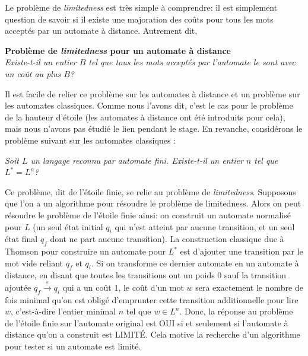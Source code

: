 \documentclass[12pt]{memoir}
\begin{document}
Le problème de \emph{limitedness} est très simple à comprendre: il est simplement
question de savoir si il existe une majoration des coûts pour tous les mots
acceptés par un automate à distance. Autrement dit,
\begin{center}
  \textbf{Problème de \emph{limitedness} pour un automate à distance}\\[2ex]
  \textit{Existe-t-il un entier $B$ tel que tous les mots acceptés par l'automate le
  sont avec un coût au plus $B$?}
\end{center}


\medskip
Il est facile de relier ce problème sur les automates à distance et un
problème sur les automates classiques. Comme nous l'avons dit, c'est le cas
pour le problème de la hauteur
d'étoile (les automates à distance ont été introduits pour cela), mais nous
n'avons pas étudié le lien pendant le stage. En revanche, considérons le
problème suivant sur les automates classiques :
\begin{center}
  \textit{Soit $L$ un langage reconnu par automate fini. Existe-t-il un entier $n$
  tel que $L^*=L^n$?}
\end{center}
Ce problème, dit de l'étoile finie, se relie au problème de \emph{limitedness}.
Supposons que l'on a un algorithme pour résoudre le problème de
limitedness. Alors on peut résoudre le problème de l'étoile finie ainsi: on
construit un automate normalisé pour $L$ (un seul état initial $q_i$ qui n'est
atteint par aucune transition, et un seul état final $q_f$ dont ne part aucune
transition). La construction classique due à Thomson pour construire un
automate pour $L^*$ est d'ajouter une transition par le mot vide reliant $q_f$ et
$q_i$. Si on transforme ce dernier automate en un automate à distance, en
disant que toutes les transitions ont un poids 0 sauf la transition ajoutée
$q_f\xrightarrow{\varepsilon}q_i$ qui a un coût 1, le coût d'un mot $w$ sera
exactement le nombre de fois minimal qu'on est obligé d'emprunter cette
transition additionnelle pour lire $w$, c'est-à-dire l'entier minimal $n$ tel
que $w\in L^n$. Donc, la réponse au problème de l'étoile finie sur l'automate
original est OUI si et seulement si l'automate à distance qu'on a construit
est LIMITÉ. Cela motive la recherche d'un algorithme pour tester si un
automate est limité.
\end{document}
